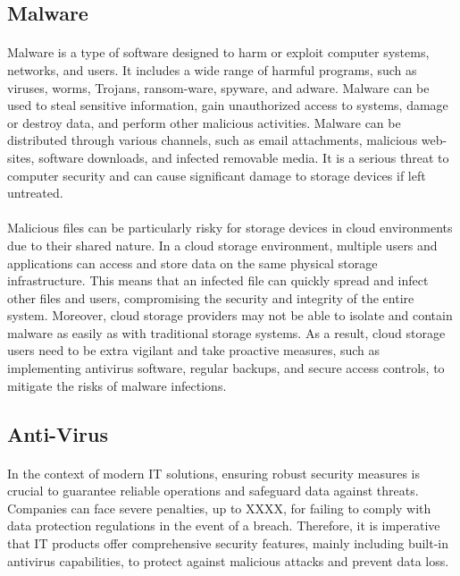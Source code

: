 \documentclass[12pt, conference, final, a4paper, onecolumn, compsoc]{IEEEtran}
\begin{document}

    \subsection*{Malware}
    \paragraph{}
    Malware is a type of software designed to harm or exploit computer systems,
    networks, and users. It includes a wide range of harmful programs, such as
    viruses, worms, Trojans, ransom-ware, spyware, and adware. Malware can be
    used to steal sensitive information, gain unauthorized access to systems,
    damage or destroy data, and perform other malicious activities. Malware can
    be distributed through various channels, such as email attachments,
    malicious web-sites, software downloads, and infected removable media. It is
    a serious threat to computer security and can cause significant damage to
    storage devices if left untreated.

    \paragraph{}
    Malicious files can be particularly risky for storage devices in cloud
    environments due to their shared nature. In a cloud storage environment,
    multiple users and applications can access and store data on the same
    physical storage infrastructure. This means that an infected file can
    quickly spread and infect other files and users, compromising the security
    and integrity of the entire system. Moreover, cloud storage providers may
    not be able to isolate and contain malware as easily as with traditional
    storage systems. As a result, cloud storage users need to be extra vigilant
    and take proactive measures, such as implementing antivirus software,
    regular backups, and secure access controls, to mitigate the risks of
    malware infections.

    \subsection*{Anti-Virus}
    \paragraph{}
    In the context of modern IT solutions, ensuring robust security measures is
    crucial to guarantee reliable operations and safeguard data against threats.
    Companies can face severe penalties, up to XXXX, for failing to comply with
    data protection regulations in the event of a breach. Therefore, it is
    imperative that IT products offer comprehensive security features, mainly
    including built-in antivirus capabilities, to protect against malicious
    attacks and prevent data loss.
\end{document}
